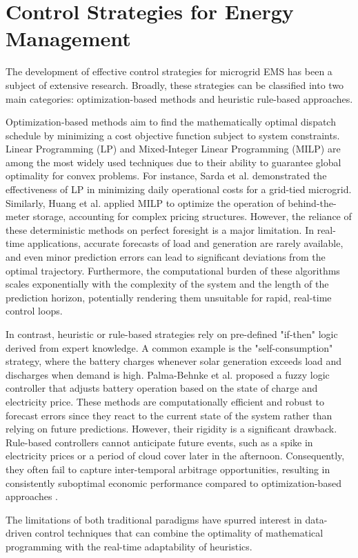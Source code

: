 
\section{Control Strategies for Energy Management}

The development of effective control strategies for microgrid EMS has been a subject of extensive research. Broadly, these strategies can be classified into two main categories: optimization-based methods and heuristic rule-based approaches.

Optimization-based methods aim to find the mathematically optimal dispatch schedule by minimizing a cost objective function subject to system constraints. Linear Programming (LP) and Mixed-Integer Linear Programming (MILP) are among the most widely used techniques due to their ability to guarantee global optimality for convex problems. For instance, Sarda et al. \cite{SARDA2022280} demonstrated the effectiveness of LP in minimizing daily operational costs for a grid-tied microgrid. Similarly, Huang et al. \cite{Huang2021} applied MILP to optimize the operation of behind-the-meter storage, accounting for complex pricing structures. However, the reliance of these deterministic methods on perfect foresight is a major limitation. In real-time applications, accurate forecasts of load and generation are rarely available, and even minor prediction errors can lead to significant deviations from the optimal trajectory. Furthermore, the computational burden of these algorithms scales exponentially with the complexity of the system and the length of the prediction horizon, potentially rendering them unsuitable for rapid, real-time control loops.

In contrast, heuristic or rule-based strategies rely on pre-defined "if-then" logic derived from expert knowledge. A common example is the "self-consumption" strategy, where the battery charges whenever solar generation exceeds load and discharges when demand is high. Palma-Behnke et al. \cite{Palma2013} proposed a fuzzy logic controller that adjusts battery operation based on the state of charge and electricity price. These methods are computationally efficient and robust to forecast errors since they react to the current state of the system rather than relying on future predictions. However, their rigidity is a significant drawback. Rule-based controllers cannot anticipate future events, such as a spike in electricity prices or a period of cloud cover later in the afternoon. Consequently, they often fail to capture inter-temporal arbitrage opportunities, resulting in consistently suboptimal economic performance compared to optimization-based approaches \cite{Abushnaf2020}.

The limitations of both traditional paradigms have spurred interest in data-driven control techniques that can combine the optimality of mathematical programming with the real-time adaptability of heuristics.
